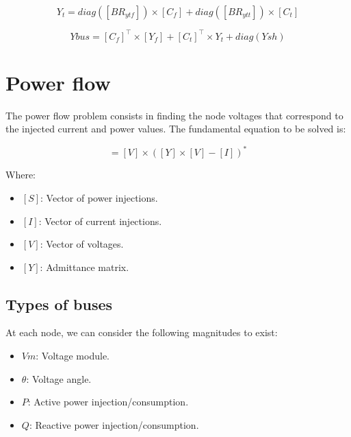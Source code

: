 \documentclass[nols,a4paper,twoside,notoc,fleqn]{tufte-book}
\begin{document}
\begin{equation}
Y_t = diag([BR_{ytf}]) \times [C_f] + diag([BR_{ytt}]) \times [C_t]
\end{equation}

\begin{equation}
Ybus = [C_f]^\top \times [Y_f] + [C_t]^\top \times Y_t + diag(Ysh)
\end{equation}

\chapter{Power flow} \label{ch:power_flow}

The power flow problem consists in finding the node voltages that correspond to the injected current and power values. The fundamental equation to be solved is:

\begin{equation}
[S] = [V] \times \left([Y] \times [V] - [I] \right)^*
\label{eq:power_flow}
\end{equation}


Where:

\begin{itemize}
\item $[S]$: Vector of power injections.
\item $[I]$: Vector of current injections.
\item $[V]$: Vector of voltages.
\item $[Y]$: Admittance matrix.
\end{itemize}


\section{Types of buses}

At each node, we can consider the following magnitudes to exist:
\begin{itemize}
	\item $Vm$: Voltage module.
	\item $\theta$: Voltage angle.
	\item $P$: Active power injection/consumption.
	\item $Q$: Reactive power injection/consumption.
\end{itemize}
\end{document}
